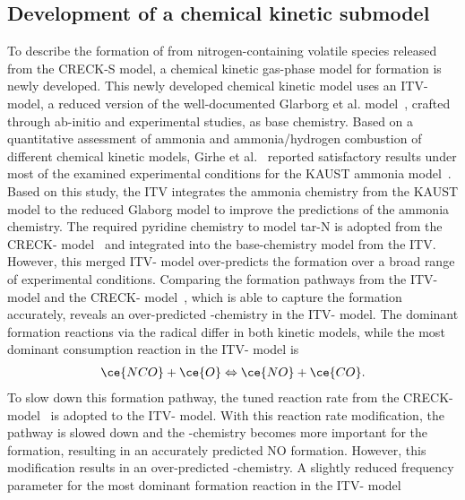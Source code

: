 \begin{refsection}
\subsection{Development of a  chemical kinetic submodel}
To describe the formation of  from nitrogen-containing volatile species released from the CRECK-S model, a chemical kinetic gas-phase model for  formation is newly developed. This newly developed chemical kinetic model uses an ITV- model, a reduced version of the well-documented Glarborg et al. model~\cite{Glarborg2018}, crafted through ab-initio and experimental studies, as base chemistry. Based on a quantitative assessment of ammonia and ammonia/hydrogen combustion of different chemical kinetic models, Girhe et al.~\cite{Girhe2024} reported satisfactory results under most of the examined experimental conditions for the KAUST ammonia model~\cite{Zhang2021}. Based on this study, the ITV integrates the ammonia chemistry from the KAUST model to the reduced Glaborg model to improve the predictions of the ammonia chemistry. The required pyridine chemistry to model tar-N is adopted from the CRECK- model~\cite{Shamooni2021} and integrated into the base-chemistry model from the ITV.
\\
However, this merged ITV- model over-predicts the  formation over a broad range of experimental conditions. Comparing the  formation pathways from the ITV- model and the CRECK- model~\cite{Shamooni2021}, which is able to capture the  formation accurately, reveals an over-predicted -chemistry in the ITV- model. The dominant  formation reactions via the  radical differ in both kinetic models, while the most dominant  consumption reaction in the ITV- model is
\begin{align}
\ce{NCO}+\ce{O} \Leftrightarrow \ce{NO}+\ce{CO}.
\end{align}
To slow down this  formation pathway, the tuned reaction rate from the CRECK- model~\cite{Shamooni2021} is adopted to the ITV- model. With this reaction rate modification, the  pathway is slowed down and the -chemistry becomes more important for the  formation, resulting in an accurately predicted NO formation. However, this modification results in an over-predicted -chemistry. A slightly reduced frequency parameter for the most dominant  formation reaction in the ITV- model
\begin{align}

\end{align}
\end{refsection}
